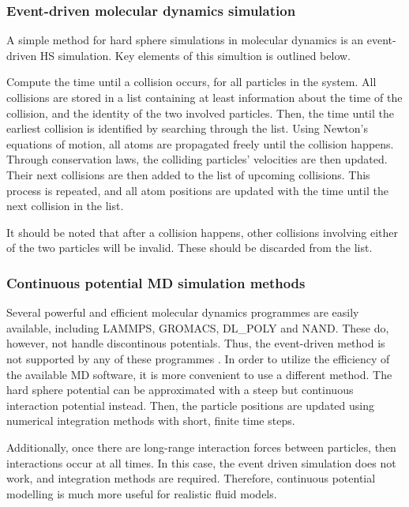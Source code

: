 \subsubsection{Event-driven molecular dynamics simulation}
A simple method for hard sphere simulations in molecular dynamics is an
event-driven HS simulation.
Key elements of this simultion is outlined below.

Compute the time until a collision occurs, for all particles in the system.
All collisions are stored in a list containing at least information about
the time of the collision, and the identity of the two involved particles.
Then, the time until the earliest collision is identified by searching through the list.
Using Newton's equations of motion, all atoms are propagated freely until
the collision happens.
Through conservation laws, the colliding particles' velocities are then updated.
Their next collisions are then added to the list of upcoming collisions.
This process is repeated, and all atom positions are updated with the time 
until the next collision in the list.

It should be noted that after a collision happens, other collisions involving
either of the two particles will be invalid.
These should be discarded from the list.

\subsubsection{Continuous potential MD simulation methods}
Several powerful and efficient molecular dynamics programmes are easily 
available, including LAMMPS, GROMACS, DL\_POLY and NAND. %
These do, however, not handle discontinous potentials.
Thus, the event-driven method is not supported by any of these programmes \cite{ref:allen:MD_sim}.
In order to utilize the efficiency of the available MD software, it is more convenient to use a different method.
The hard sphere potential can be approximated with a steep but continuous interaction potential instead.
Then, the particle positions are updated using numerical integration methods with short, finite time steps.

Additionally, once there are long-range interaction forces 
between particles, then interactions occur at all times.
In this case, the event driven simulation does not 
work, and integration methods are required.
Therefore, continuous potential modelling 
is much more useful for realistic fluid models.

